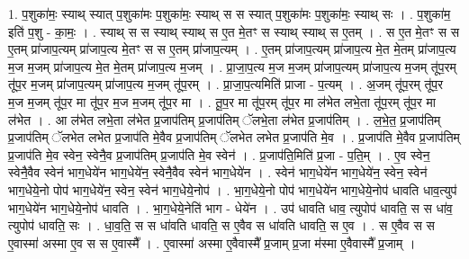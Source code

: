 \documentclass[17pt]{extarticle}
\begin{document}
1. प॒शुका॑मः॒ स्याथ् स्यात् प॒शुका॑मः प॒शुका॑मः॒ स्याथ् स स स्यात् प॒शुका॑मः प॒शुका॑मः॒ स्याथ् सः । . प॒शुका॑म॒ इति॑ प॒शु - का॒मः॒ । . स्याथ् स स स्याथ् स्याथ् स ए॒त मे॒तꣳ स स्याथ् स्याथ् स ए॒तम् । . स ए॒त मे॒तꣳ स स ए॒तम् प्रा॑जाप॒त्यम् प्रा॑जाप॒त्य मे॒तꣳ स स ए॒तम् प्रा॑जाप॒त्यम् । . ए॒तम् प्रा॑जाप॒त्यम् प्रा॑जाप॒त्य मे॒त मे॒तम् प्रा॑जाप॒त्य म॒ज म॒जम् प्रा॑जाप॒त्य मे॒त मे॒तम् प्रा॑जाप॒त्य म॒जम् । . प्रा॒जा॒प॒त्य म॒ज म॒जम् प्रा॑जाप॒त्यम् प्रा॑जाप॒त्य म॒जम् तू॑प॒रम् तू॑प॒र म॒जम् प्रा॑जाप॒त्यम् प्रा॑जाप॒त्य म॒जम् तू॑प॒रम् । . प्रा॒जा॒प॒त्यमिति॑ प्राजा - प॒त्यम् । . अ॒जम् तू॑प॒रम् तू॑प॒र म॒ज म॒जम् तू॑प॒र मा तू॑प॒र म॒ज म॒जम् तू॑प॒र मा । . तू॒प॒र मा तू॑प॒रम् तू॑प॒र मा ल॑भेत लभे॒ता तू॑प॒रम् तू॑प॒र मा ल॑भेत । . आ ल॑भेत लभे॒ता ल॑भेत प्र॒जाप॑तिम् प्र॒जाप॑तिम् ॅलभे॒ता ल॑भेत प्र॒जाप॑तिम् । . ल॒भे॒त॒ प्र॒जाप॑तिम् प्र॒जाप॑तिम् ॅलभेत लभेत प्र॒जाप॑ति मे॒वैव प्र॒जाप॑तिम् ॅलभेत लभेत प्र॒जाप॑ति मे॒व । . प्र॒जाप॑ति मे॒वैव प्र॒जाप॑तिम् प्र॒जाप॑ति मे॒व स्वेन॒ स्वेनै॒व प्र॒जाप॑तिम् प्र॒जाप॑ति मे॒व स्वेन॑ । . प्र॒जाप॑ति॒मिति॑ प्र॒जा - प॒ति॒म् । . ए॒व स्वेन॒ स्वेनै॒वैव स्वेन॑ भाग॒धेये॑न भाग॒धेये॑न॒ स्वेनै॒वैव स्वेन॑ भाग॒धेये॑न । . स्वेन॑ भाग॒धेये॑न भाग॒धेये॑न॒ स्वेन॒ स्वेन॑ भाग॒धेये॒नो पोप॑ भाग॒धेये॑न॒ स्वेन॒ स्वेन॑ भाग॒धेये॒नोप॑ । . भा॒ग॒धेये॒नो पोप॑ भाग॒धेये॑न भाग॒धेये॒नोप॑ धावति धाव॒त्युप॑ भाग॒धेये॑न भाग॒धेये॒नोप॑ धावति । . भा॒ग॒धेये॒नेति॑ भाग - धेये॑न । . उप॑ धावति धाव॒ त्युपोप॑ धावति॒ स स धा॑व॒ त्युपोप॑ धावति॒ सः । . धा॒व॒ति॒ स स धा॑वति धावति॒ स ए॒वैव स धा॑वति धावति॒ स ए॒व । . स ए॒वैव स स ए॒वास्मा॑ अस्मा ए॒व स स ए॒वास्मै᳚ । . ए॒वास्मा॑ अस्मा ए॒वैवास्मै᳚ प्र॒जाम् प्र॒जा म॑स्मा ए॒वैवास्मै᳚ प्र॒जाम् । \newline
\end{document}
